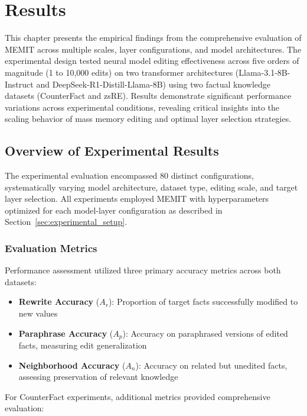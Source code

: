 \chapter{Results}
\label{ch:results}

This chapter presents the empirical findings from the comprehensive evaluation of MEMIT across multiple scales, layer configurations, and model architectures. The experimental design tested neural model editing effectiveness across five orders of magnitude (1 to 10,000 edits) on two transformer architectures (Llama-3.1-8B-Instruct and DeepSeek-R1-Distill-Llama-8B) using two factual knowledge datasets (CounterFact and zsRE). Results demonstrate significant performance variations across experimental conditions, revealing critical insights into the scaling behavior of mass memory editing and optimal layer selection strategies.

\section{Overview of Experimental Results}
\label{sec:results_overview}

The experimental evaluation encompassed 80 distinct configurations, systematically varying model architecture, dataset type, editing scale, and target layer selection. All experiments employed MEMIT with hyperparameters optimized for each model-layer configuration as described in Section~\ref{sec:experimental_setup}. 

\subsection{Evaluation Metrics}
\label{subsec:evaluation_metrics}

Performance assessment utilized three primary accuracy metrics across both datasets:

\begin{itemize}
    \item \textbf{Rewrite Accuracy} ($A_r$): Proportion of target facts successfully modified to new values
    \item \textbf{Paraphrase Accuracy} ($A_p$): Accuracy on paraphrased versions of edited facts, measuring edit generalization
    \item \textbf{Neighborhood Accuracy} ($A_n$): Accuracy on related but unedited facts, assessing preservation of relevant knowledge
\end{itemize}

For CounterFact experiments, additional metrics provided comprehensive evaluation:

